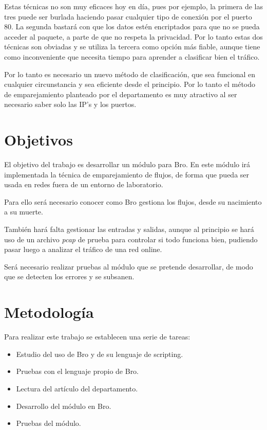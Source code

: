 Estas técnicas no son muy eficaces hoy en día, pues por ejemplo, la primera de las tres puede ser burlada 
haciendo pasar cualquier tipo de conexión por el puerto 80. La segunda bastará con que los datos estén 
encriptados para que no se pueda acceder al paquete, a parte de que no respeta la privacidad. Por lo tanto estas 
dos técnicas son obviadas y se utiliza la tercera como opción más fiable, aunque tiene como inconveniente que 
necesita tiempo para aprender a clasificar bien el tráfico.

\intro Por lo tanto es necesario un nuevo método de clasificación, que sea funcional en cualquier circunstancia 
y sea eficiente desde el principio. Por lo tanto el método de emparejamiento planteado por el departamento es 
muy atractivo al ser necesario saber solo las IP's y los puertos. \cite{comparacion}

\section{Objetivos}

El objetivo del trabajo es desarrollar un módulo para Bro. En este módulo irá implementada la 
técnica de emparejamiento de flujos, de forma que pueda ser usada en redes fuera de un entorno de laboratorio.

\intro Para ello será necesario conocer como Bro gestiona los flujos, desde su nacimiento a su muerte. 

\intro También hará falta gestionar las entradas y salidas, aunque al principio se hará uso de un 
archivo \textit{pcap} de prueba para controlar si todo funciona bien, 
pudiendo pasar luego a analizar el tráfico de una red online.

\intro Será necesario realizar pruebas al módulo que se pretende desarrollar, de modo que se detecten los 
errores y se subsanen.

\section{Metodología}

Para realizar este trabajo se establecen una serie de tareas:

\begin{itemize}
\item Estudio del uso de Bro y de su lenguaje de scripting.
\item Pruebas con el lenguaje propio de Bro.
\item Lectura del artículo del departamento. \cite{comparacion}
\item Desarrollo del módulo en Bro.
\item Pruebas del módulo.
\end{itemize}

